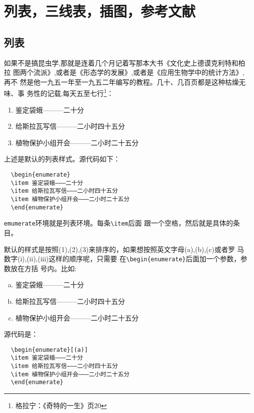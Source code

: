 
\chapter{列表，三线表，插图，参考文献}
\label{chap02}

\section{列表}
\label{sec:23}

如果不是搞昆虫学,那就是连着几个月记着写那本大书《文化史上德谟克利特和柏拉
图两个流派》,或者是《形态学的发展》,或者是《应用生物学中的统计方法》,再不
然是他一九五一年至一九五二年编写的教程。几十、几百页都是这种枯燥无味、事
务性的记载,每天五至七行\footnote{格拉宁：《奇特的一生》页20}：
\begin{enumerate}
\item 鉴定袋蛾———二十分
\item 给斯拉瓦写信———二小时四十五分
\item 植物保护小组开会———二小时二十五分
\end{enumerate}

上述是默认的列表样式。源代码如下：
\begin{lstlisting}
  \begin{enumerate}
  \item 鉴定袋蛾———二十分
  \item 给斯拉瓦写信———二小时四十五分
  \item 植物保护小组开会———二小时二十五分
  \end{enumerate}
\end{lstlisting}

\texttt{emumerate}环境就是列表环境。每条\texttt{\textbackslash{item}}后面
跟一个空格，然后就是具体的条目。

默认的样式是按照(1),(2),(3)来排序的，如果想按照英文字母(a),(b),(c)或者罗
马数字(i),(ii),(iii)这样的顺序呢，只需要
在\texttt{\textbackslash{begin}\{enumerate\}}后面加一个参数，参数放在方括
号内。比如:
\begin{enumerate}[(a)]
\item 鉴定袋蛾———二十分
\item 给斯拉瓦写信———二小时四十五分
\item 植物保护小组开会———二小时二十五分
\end{enumerate}
源代码是：
\begin{lstlisting}
  \begin{enumerate}[(a)]
  \item 鉴定袋蛾———二十分
  \item 给斯拉瓦写信———二小时四十五分
  \item 植物保护小组开会———二小时二十五分
  \end{enumerate}
\end{lstlisting}


